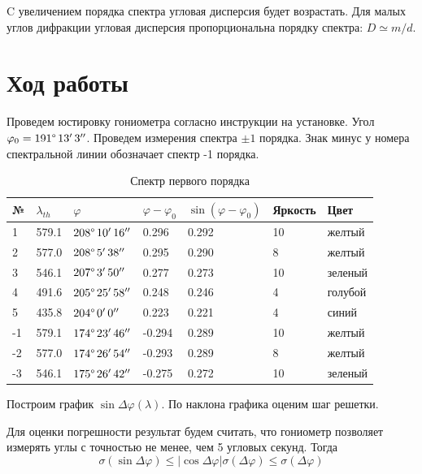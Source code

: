 \documentclass[a4paper,12pt]{article}
\begin{document}
	C увеличением порядка спектра угловая дисперсия будет возрастать. Для малых углов дифракции угловая дисперсия пропорциональна порядку спектра: $D\simeq m/d$.
	
	
	
	
	\section{Ход работы}
		Проведем юстировку гониометра согласно инструкции на установке. Угол $\varphi_0 = 191\degree\, 13'\, 3''$. Проведем измерения спектра $\pm1$ порядка.
		Знак минус у номера спектральной линии обозначает спектр -1 порядка.
		
		
		\begin{table}[h]
			\centering
			\caption{Спектр первого порядка}
			\label{table1}
			\begin{tabular}{|l|l|l|l|l|l|l|}
				\hline
				№ & $\lambda_{th}$  & $\varphi$ & $\varphi-\varphi_0$ & $\sin\left(\varphi-\varphi_0\right)$ & Яркость & Цвет \\ \hline
				1 & 579.1 & $208\degree\, 10'\, 16''$& 0.296 & 0.292 & 10 & желтый  \\ \hline
				2 & 577.0 & $208\degree\, 5'\, 38''$ & 0.295 & 0.290 & 8 & желтый \\ \hline
				3 & 546.1 & $207\degree\, 3'\, 50''$ & 0.277 & 0.273 & 10 & зеленый \\ \hline
				4 & 491.6 & $205\degree\, 25'\, 58''$& 0.248 & 0.246 & 4 & голубой \\ \hline
				5 & 435.8 & $204\degree\, 0'\, 0''$  & 0.223 & 0.221 & 4 & синий \\ \hline
				-1 & 579.1 & $174\degree\, 23'\, 46''$ & -0.294 & 0.289 & 10 & желтый \\ \hline
				-2 & 577.0 & $174\degree\, 26'\, 54''$ & -0.293 & 0.289 & 8 & желтый \\ \hline
				-3 & 546.1 & $175\degree\, 26'\, 42''$ & -0.275 & 0.272 & 10 & зеленый \\ \hline
			\end{tabular}
		\end{table}
	
		Построим график $\sin\Delta\varphi(\lambda)$. По наклона графика оценим шаг решетки.
		
		Для оценки погрешности результат будем считать, что гониометр позволяет измерять углы с точностью не менее, чем 5 угловых секунд. Тогда $$\sigma(\sin\Delta\varphi) \leq \left|\cos\Delta\varphi\right|\sigma(\Delta\varphi) \leq \sigma(\Delta\varphi)$$
		
\end{document}
